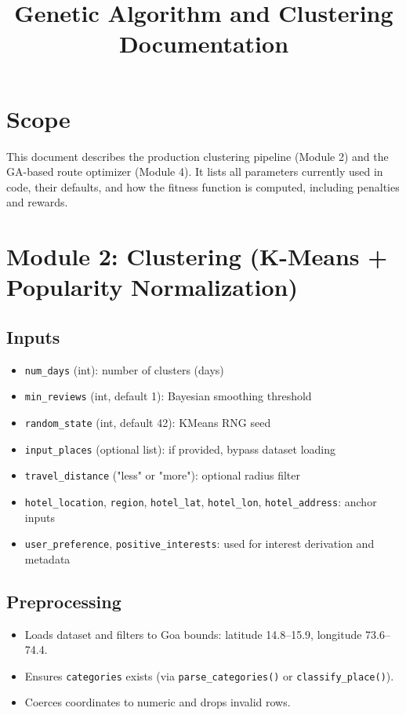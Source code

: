 \documentclass[11pt]{article}
\title{Genetic Algorithm and Clustering Documentation}
\date{}
\begin{document}
\maketitle

\section{Scope}
This document describes the production clustering pipeline (Module 2) and the GA-based route optimizer (Module 4). It lists all parameters currently used in code, their defaults, and how the fitness function is computed, including penalties and rewards.

\section{Module 2: Clustering (K-Means + Popularity Normalization)}

\subsection{Inputs}
\begin{itemize}
  \item \texttt{num\_days} (int): number of clusters (days)
  \item \texttt{min\_reviews} (int, default 1): Bayesian smoothing threshold
  \item \texttt{random\_state} (int, default 42): KMeans RNG seed
  \item \texttt{input\_places} (optional list): if provided, bypass dataset loading
  \item \texttt{travel\_distance} ("less" or "more"): optional radius filter
  \item \texttt{hotel\_location}, \texttt{region}, \texttt{hotel\_lat}, \texttt{hotel\_lon}, \texttt{hotel\_address}: anchor inputs
  \item \texttt{user\_preference}, \texttt{positive\_interests}: used for interest derivation and metadata
\end{itemize}

\subsection{Preprocessing}
\begin{itemize}
  \item Loads dataset and filters to Goa bounds: latitude 14.8--15.9, longitude 73.6--74.4.
  \item Ensures \texttt{categories} exists (via \texttt{parse\_categories()} or \texttt{classify\_place()}).
  \item Coerces coordinates to numeric and drops invalid rows.
\end{itemize}
\end{document}
